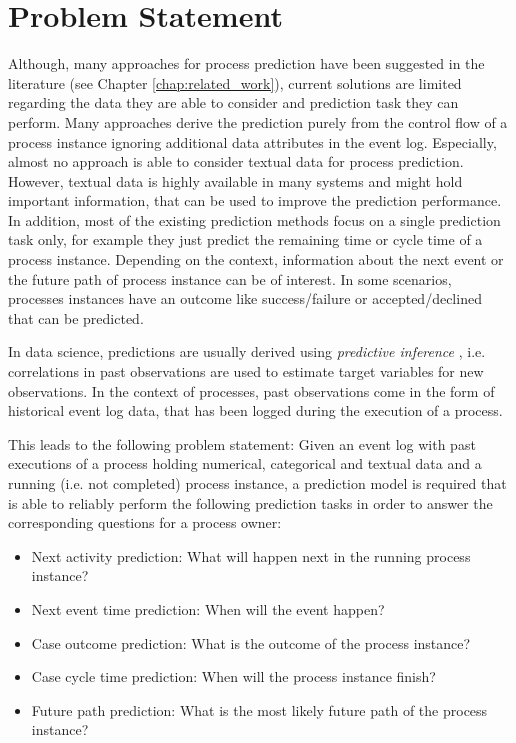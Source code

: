 \section{Problem Statement}

Although, many approaches for process prediction have been suggested in the literature (see Chapter \ref{chap:related_work}), current solutions are limited regarding the data they are able to consider and prediction task they can perform.
Many approaches derive the prediction purely from the control flow of a process instance ignoring additional data attributes in the event log.
Especially, almost no approach is able to consider textual data for process prediction.
However, textual data is highly available in many systems and might hold important information, that can be used to improve the prediction performance.
In addition, most of the existing prediction methods focus on a single prediction task only, for example they just predict the remaining time or cycle time of a process instance.
Depending on the context, information about the next event or the future path of process instance can be of interest.
In some scenarios, processes instances have an outcome like success/failure or accepted/declined that can be predicted.

In data science, predictions are usually derived using \textit{predictive inference} \cite{predinf}, i.e. correlations in past observations are used to estimate target variables for new observations.
In the context of processes, past observations come in the form of historical event log data, that has been logged during the execution of a process.

This leads to the following problem statement:
Given an event log with past executions of a process holding numerical, categorical and textual data and a running (i.e. not completed) process instance, a prediction model is required that is able to reliably perform the following prediction tasks in order to answer the corresponding questions for a process owner:

\begin{itemize}
	\item Next activity prediction: What will happen next in the running process instance?
	\item Next event time prediction: When will the event happen?
	\item Case outcome prediction: What is the outcome of the process instance?
	\item Case cycle time prediction: When will the process instance finish?
	\item Future path prediction: What is the most likely future path of the process instance?
\end{itemize}

